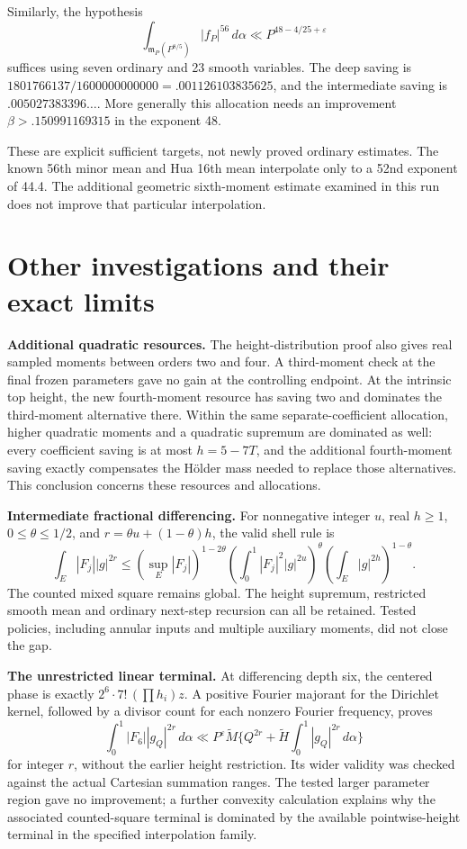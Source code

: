 \documentclass[11pt,letterpaper]{article}
\theoremstyle{remark}
\newcommand{\m}{\mathfrak m}
\newcommand{\eps}{\varepsilon}
\newcommand{\dd}{\,d\alpha}
\begin{document}
Similarly, the hypothesis
\[
 \int_{\m_P(P^{8/5})}|f_P|^{56}\dd\ll P^{48-4/25+\eps}
\]
suffices using seven ordinary and 23 smooth variables. The deep saving is
$1801766137/1600000000000=.001126103835625$, and the intermediate saving is
$.005027383396\ldots$. More generally this allocation needs an improvement
$\beta>.150991169315$ in the exponent 48.

These are explicit sufficient targets, not newly proved ordinary estimates. The
known 56th minor mean and Hua 16th mean interpolate only to a 52nd exponent of 44.4.
The additional geometric sixth-moment estimate examined in this run does not
improve that particular interpolation.

\section{Other investigations and their exact limits}

\textbf{Additional quadratic resources.}
The height-distribution proof also gives real sampled moments between orders two
and four. A third-moment check at the final frozen parameters gave no gain at the
controlling endpoint. At the intrinsic top height, the new fourth-moment resource
has saving two and dominates the third-moment alternative there. Within the same
separate-coefficient allocation, higher quadratic moments and a quadratic supremum
are dominated as well: every coefficient saving is at most $h=5-7T$, and the
additional fourth-moment saving exactly compensates the H\"older mass needed to
replace those alternatives. This conclusion concerns these resources and allocations.

\textbf{Intermediate fractional differencing.}
For nonnegative integer $u$, real $h\ge1$, $0\le\theta\le1/2$, and
$r=\theta u+(1-\theta)h$, the valid shell rule is
\[
 \int_E|F_j||g|^{2r}\le(\sup_E|F_j|)^{1-2\theta}
       \left(\int_0^1|F_j|^2|g|^{2u}\right)^\theta
       \left(\int_E|g|^{2h}\right)^{1-\theta}.
\]
The counted mixed square remains global. The height supremum, restricted smooth
mean and ordinary next-step recursion can all be retained. Tested policies,
including annular inputs and multiple auxiliary moments, did not close the gap.

\textbf{The unrestricted linear terminal.}
At differencing depth six, the centered phase is exactly
$2^6\cdot7!\,(\prod h_i)z$. A positive Fourier majorant for the Dirichlet kernel,
followed by a divisor count for each nonzero Fourier frequency, proves
\[
 \int_0^1|F_6||g_Q|^{2r}\dd
 \ll P^\eps\widetilde M\{Q^{2r}+\widetilde H\int_0^1|g_Q|^{2r}\dd\}
\]
for integer $r$, without the earlier height restriction. Its wider validity was
checked against the actual Cartesian summation ranges. The tested larger parameter
region gave no improvement; a further convexity calculation explains why the
associated counted-square terminal is dominated by the available pointwise-height
terminal in the specified interpolation family.
\end{document}
